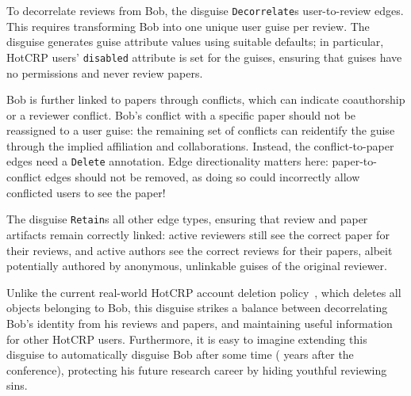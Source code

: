 %
To decorrelate reviews from Bob, the disguise \texttt{Decorrelate}s user-to-review edges.
%
This requires transforming Bob into one unique user guise per review.
%
The disguise generates guise attribute values using suitable defaults;
%
in particular, HotCRP users' \texttt{disabled} attribute is set for the guises,
ensuring that guises have no permissions and never review papers.
%

%
Bob is further linked to papers through conflicts, which can indicate coauthorship or a
reviewer conflict.
%
Bob's conflict with a specific paper should not be reassigned to a user guise: the remaining set
of conflicts can reidentify the guise through the implied affiliation and collaborations.
%
Instead, the conflict-to-paper edges need a \texttt{Delete} annotation.
%
Edge directionality matters here: paper-to-conflict edges should not be removed, as doing so
could incorrectly allow conflicted users to see the paper!

The disguise \texttt{Retain}s all other edge types, ensuring that review and paper
artifacts remain correctly linked: active reviewers still see the correct paper for their reviews,
and active authors see the correct reviews for their papers, albeit potentially authored by
anonymous, unlinkable guises of the original reviewer.
%
%

%
Unlike the current real-world HotCRP account deletion policy~\cite{hotcrp:privacy}, which
deletes all objects belonging to Bob, this disguise strikes a balance between decorrelating
Bob's identity from his reviews and papers, and maintaining useful information for other
HotCRP users.
%
Furthermore, it is easy to imagine extending this disguise to automatically disguise Bob
after some time ( years after the conference), protecting his future research career
by hiding youthful reviewing sins.
%


\iffalse


